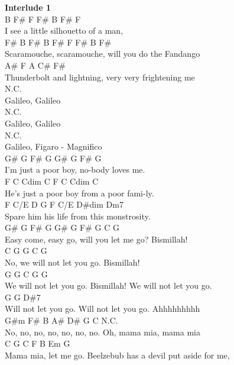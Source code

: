\documentclass[a4paper]{article}
\begin{document}
{{        }
        \pagebreak
        \textbf{Interlude 1}
        ~\\
        {
            \cutive
            \obeyspaces
B F\#    F      F\#    B    F\#   F
\\
I see a little silhouetto of a man,
\\
F\#   B       F\#   B       F\#       F      F\# B  F\#
\\
Scaramouche, scaramouche, will you do the Fandango
\\
A\#              F          A         C\#          F\#
\\
Thunderbolt and lightning, very very frightening me
\\
N.C.
\\
Galileo, Galileo
\\
N.C.
\\
Galileo, Galileo
\\
N.C.
\\
Galileo, Figaro - Magnifico
\\
G\#  G      F\#   G    G\# G    F\#    G
\\
I'm just a poor boy, no-body loves me.
\\
F    C      Cdim C   F      C    Cdim C
\\
He's just a poor boy from a poor fami-ly.
\\
F             C/E            D        G    F  C/E  D\#dim  Dm7
\\
Spare him his life from this monstrosity.
\\
G\#   G     F\#   G   G\#       G      F\#   G  C  G
\\
Easy come, easy go, will you let me go?  Bismillah!
\\
C      G                     G  C  G
\\
No, we will not let you go.  Bismillah!
\\
G                        G  C  G     G
\\
We will not let you go.  Bismillah!  We will not let you go.
\\
G                     G                         D\#7
\\
Will not let you go.  Will not let you go. Ahhhhhhhhh
\\
G\#m F\#  B   A\#  D\#  G   C    N.C.
\\
No, no, no, no, no, no, no.  Oh, mama mia, mama mia
\\
     C           G      C   F         B          Em       G
\\
Mama mia, let me go.  Beelzebub has a devil put aside for me,
\\

}}
\end{document}
